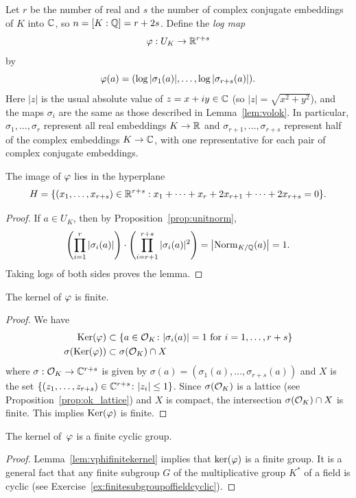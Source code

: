 Let $r$ be the number of real and $s$ the number of complex conjugate
embeddings of $K$ into $\mathbb{C}$, so $n=[K:\mathbb{Q}]=r+2s$.
Define the {\em log map}
$$
\varphi:U_K \to \mathbb{R}^{r+s}
$$
by
$$
 \varphi(a) = (\log|\sigma_1(a)|,\ldots, \log|\sigma_{r+s}(a)|).
$$
Here $|z|$ is the usual absolute value of $z=x+iy\in\mathbb{C}$
(so $|z|=\sqrt{x^2+y^2}$), and the maps $\sigma_i$ are
the same as those described in Lemma~\ref{lem:volok}.
In particular,
$\sigma_1,\dots,\sigma_r$ represent all real embeddings
$K\to\mathbb{R}$ and $\sigma_{r+1},\dots,\sigma_{r+s}$ represent
half of the complex embeddings $K\to\mathbb{C}$, with one representative
for each pair of complex conjugate embeddings.

\begin{lemma}\label{lem:inh}
The image of $\varphi$ lies in the hyperplane
\begin{equation}\label{eqn:hyperplane}
H = \{(x_1,\ldots, x_{r+s})\in\mathbb{R}^{r+s} :
  x_1+ \cdots + x_r + 2x_{r+1} + \cdots + 2x_{r+s} = 0\}.
\end{equation}
\end{lemma}
\begin{proof}
If $a\in U_K$, then
by Proposition~\ref{prop:unitnorm},
$$\left(\prod_{i=1}^{r} |\sigma_i(a)|\right)
  \cdot \left( \prod_{i=r+1}^{r+s} |\sigma_i(a)|^2 \right) =
\left|\operatorname{Norm}_{K/\mathbb{Q}}(a)\right| = 1.$$
Taking logs of both sides proves the lemma.
\end{proof}

\begin{lemma}\label{lem:vphifinitekernel}
The kernel of $\varphi$ is finite.
\end{lemma}
\begin{proof}
We have
\begin{align*}
  \operatorname{Ker}(\varphi) &\subset \{a\in\mathcal{O}_K \colon |\sigma_i(a)| = 1 \text{ for }i=1,\ldots,r+s\}
  \\
  \sigma(\operatorname{Ker}(\varphi)) &\subset \sigma(\mathcal{O}_K) \cap X
\end{align*}
where $\sigma:\mathcal{O}_K \to \mathbb{C}^{r+s}$ is given by
$\sigma(a) = \left(\sigma_1(a),\dots,\sigma_{r+s}(a)\right)$ and
$X$ is the set $\left\{(z_1,\dots,z_{r+s})\in\mathbb{C}^{r+s} \colon |z_i|\leq 1\right\}$.
Since $\sigma(\mathcal{O}_K)$ is a lattice (see Proposition~\ref{prop:ok_lattice})
and $X$ is compact, the intersection $\sigma(\mathcal{O}_K)\cap X$ is finite.
This implies $\operatorname{Ker}(\varphi)$ is finite.
\end{proof}

\begin{lemma}\label{lem:kerfcg}
The kernel of~$\varphi$ is a finite cyclic group.
\end{lemma}
\begin{proof}
  Lemma~\ref{lem:vphifinitekernel} implies that $\ker(\varphi)$ is a
  finite group.  It is a general fact that any finite subgroup $G$ of
  the multiplicative group $K^*$ of a field is cyclic (see
  Exercise~\ref{ex:finitesubgroupoffieldcyclic}).
\end{proof}

